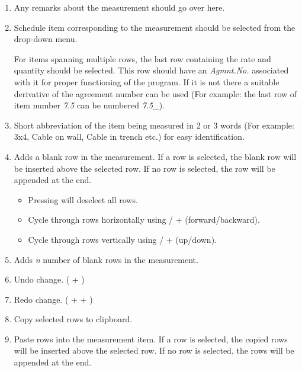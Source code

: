 \documentclass[twoside,a4paper]{refart}
\newenvironment{noteblock}[1]%
{\begin{mdframed}[topline=false,bottomline=false, rightline=false,
		linewidth=2pt, frametitle={#1}]}%
		{\end{mdframed}}
\begin{document}
	 \begin{enumerate}
	 	\item Any remarks about the measurement should go over here.
	 	\item Schedule item corresponding to the measurement should be selected from the drop-down menu.\\
	 	\begin{noteblock}{Note:}
	 		For items spanning multiple rows, the last row containing the rate and quantity should be selected. This row should have an \emph{Agmnt.No.} associated with it for proper functioning of the program. If it is not there a suitable derivative of the agreement number can be used (For example: the last row of item number \emph{7.5} can be numbered \emph{7.5\_}).
 		\end{noteblock}
 		\item Short abbreviation of the item being measured in 2 or 3 words (For example: 3x4, Cable on wall, Cable in trench etc.) for easy identification.
	 	\item Adds a blank row in the measurement. If a row is selected, the blank row will be inserted above the selected row. If no row is selected, the row will be appended at the end.\\
	 	\begin{noteblock}{Tips!}
	 		\begin{itemize}
		 		\item Pressing  will deselect all rows.
		 		\item Cycle through rows horizontally using  / + (forward/backward).
		 		\item Cycle through rows vertically using  / + (up/down).
	 		\end{itemize}
	 	\end{noteblock}
	 	\item Adds \emph{n} number of blank rows in the measurement.
	 	\item Undo change. ( + )
	 	\item Redo change. ( +  + )	 
	 	\item Copy selected rows to clipboard.
	 	\item Paste rows into the measurement item. If a row is selected, the copied rows will be inserted above the selected row. If no row is selected, the rows will be appended at the end.

\end{enumerate}
\end{document}

